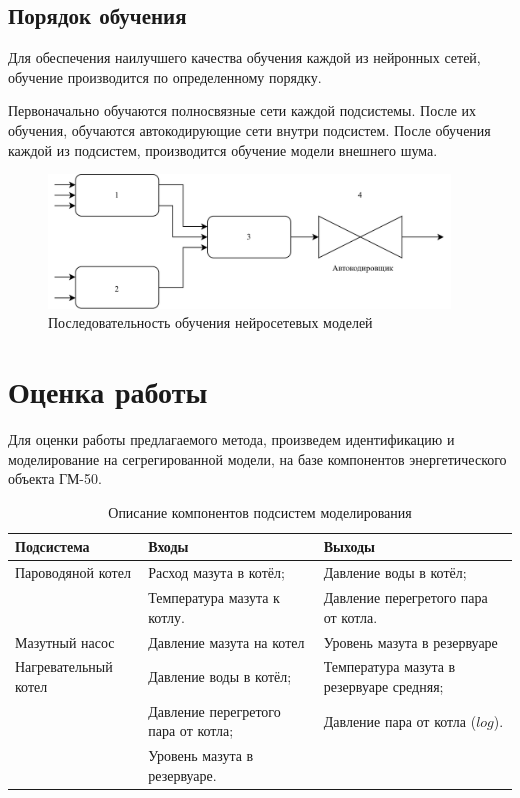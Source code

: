 \subsection{Порядок обучения}

Для обеспечения наилучшего качества обучения каждой из нейронных сетей, обучение
производится по определенному порядку. 

Первоначально обучаются полносвязные сети каждой подсистемы. После их обучения,
обучаются автокодирующие сети внутри подсистем. После обучения каждой из
подсистем, производится обучение модели внешнего шума. 

\begin{figure}[H]
  \begin{center}
    \includegraphics[width=0.95\textwidth]{figures/nn_full_learning.png}
  \end{center}
  \caption{Последовательность обучения нейросетевых
  моделей}\label{fig:nn:learning}
\end{figure}



\section{Оценка работы}

Для оценки работы предлагаемого метода, произведем идентификацию и моделирование
на сегрегированной модели, на базе компонентов энергетического объекта ГМ-50. 

\begin{table}[H]
\caption{Описание компонентов подсистем моделирования}\label{tab:subsystems}
\begin{tabular}{|p{}|p{}|p{}|}
    \hline
    Подсистема  & Входы & Выходы \\
    \hline 
    Пароводяной котел & Расход мазута в котёл;  & Давление воды в котёл; \\
                      & Температура мазута к котлу. & Давление перегретого пара
                      от котла. \\
    \hline 
    Мазутный насос    & Давление мазута на котел & Уровень мазута в резервуаре
    \\
    \hline
    Нагревательный котел & Давление воды в котёл; & Температура мазута в
    резервуаре средняя;\\
                         & Давление перегретого пара от котла; & Давление пара
                         от котла ($log$).\\
                         & Уровень мазута в резервуаре. & \\
    \hline
\end{tabular}
\end{table}

